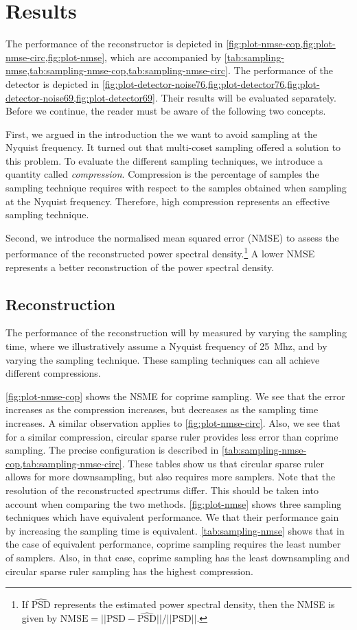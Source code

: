 \documentclass[a4paper, openany, oneside]{memoir}
\begin{document}
\section{Results}
The performance of the reconstructor is depicted in \cref{fig:plot-nmse-cop,fig:plot-nmse-circ,fig:plot-nmse}, which are accompanied by \cref{tab:sampling-nmse,tab:sampling-nmse-cop,tab:sampling-nmse-circ}. The performance of the detector is depicted in \cref{fig:plot-detector-noise76,fig:plot-detector76,fig:plot-detector-noise69,fig:plot-detector69}. Their results will be evaluated separately. Before we continue, the reader must be aware of the following two concepts.

First, we argued in the introduction the we want to avoid sampling at the Nyquist frequency. It turned out that multi-coset sampling offered a solution to this problem. To evaluate the different sampling techniques, we introduce a quantity called \textit{compression}. Compression is the percentage of samples the sampling technique requires with respect to the samples obtained when sampling at the Nyquist frequency. Therefore, high compression represents an effective sampling technique.

Second, we introduce the normalised mean squared error (NMSE) to assess the performance of the reconstructed power spectral density.\footnote{If $\hat{\text{PSD}}$ represents the estimated power spectral density, then the NMSE is given by $\text{NMSE} = ||\text{PSD} - \hat{\text{PSD}}||/||\text{PSD}||$.} A lower NMSE represents a better reconstruction of the power spectral density.

\subsection{Reconstruction}
The performance of the reconstruction will by measured by varying the sampling time, where we illustratively assume a Nyquist frequency of \SI{25}{Mhz}, and by varying the sampling technique. These sampling techniques can all achieve different compressions.

\cref{fig:plot-nmse-cop} shows the NSME for coprime sampling. We see that the error increases as the compression increases, but decreases as the sampling time increases. A similar observation applies to \cref{fig:plot-nmse-circ}. Also, we see that for a similar compression, circular sparse ruler provides less error than coprime sampling. The precise configuration is described in \cref{tab:sampling-nmse-cop,tab:sampling-nmse-circ}. These tables show us that circular sparse ruler allows for more downsampling, but also requires more samplers. Note that the resolution of the reconstructed spectrums differ. This should be taken into account when comparing the two methods. \cref{fig:plot-nmse} shows three sampling techniques which have equivalent performance. We that their performance gain by increasing the sampling time is equivalent. \cref{tab:sampling-nmse} shows that in the case of equivalent performance, coprime sampling requires the least number of samplers. Also, in that case, coprime sampling has the least downsampling and circular sparse ruler sampling has the highest compression.
\end{document}
